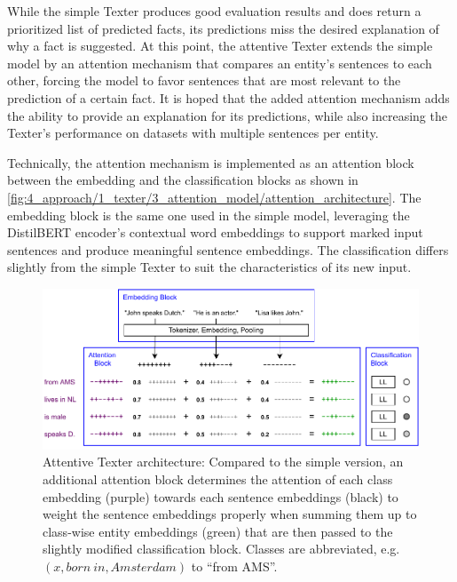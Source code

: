 While the simple Texter produces good evaluation results and does return a prioritized list of predicted facts, its predictions miss the desired explanation of why a fact is suggested. At this point, the attentive Texter extends the simple model by an attention mechanism that compares an entity's sentences to each other, forcing the model to favor sentences that are most relevant to the prediction of a certain fact. It is hoped that the added attention mechanism adds the ability to provide an explanation for its predictions, while also increasing the Texter's performance on datasets with multiple sentences per entity.

Technically, the attention mechanism is implemented as an attention block between the embedding and the classification blocks as shown in \autoref{fig:4_approach/1_texter/3_attention_model/attention_architecture}. The embedding block is the same one used in the simple model, leveraging the DistilBERT encoder's contextual word embeddings to support marked input sentences and produce meaningful sentence embeddings. The classification differs slightly from the simple Texter to suit the characteristics of its new input.

\begin{figure}[t]
    \includegraphics[width=\textwidth]{4_approach/1_texter/3_attention_model/attention_architecture}
    \caption{Attentive Texter architecture: Compared to the simple version, an additional attention block determines the attention of each class embedding (purple) towards each sentence embeddings (black) to weight the sentence embeddings properly when summing them up to class-wise entity embeddings (green) that are then passed to the slightly modified classification block. Classes are abbreviated, e.g. $(x, born~in, Amsterdam)$ to ``from AMS''.}
    \label{fig:4_approach/1_texter/3_attention_model/attention_architecture}
\end{figure}

